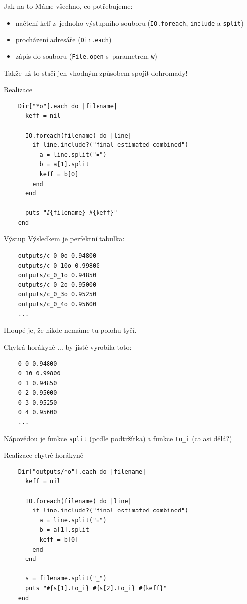 \documentclass{beamer}
\begin{document}
\begin{frame}{Jak na to}
  Máme všechno, co potřebujeme:
  \begin{itemize}
    \item načtení keff z~jednoho výstupního souboru (\texttt{IO.foreach}, \texttt{include} a \texttt{split})
    \item procházení adresáře (\texttt{Dir.each})
    \item zápis do souboru (\texttt{File.open} s~parametrem \texttt{w})
  \end{itemize}
  Takže už to stačí jen vhodným způsobem spojit dohromady!
\end{frame}

\begin{frame}[fragile]{Realizace}
  \scriptsize
  \begin{verbatim}
    Dir["*o"].each do |filename|
      keff = nil

      IO.foreach(filename) do |line|
        if line.include?("final estimated combined")
          a = line.split("=")
          b = a[1].split
          keff = b[0]
        end
      end

      puts "#{filename} #{keff}"
    end
  \end{verbatim}
\end{frame}

\begin{frame}[fragile]{Výstup}
  Výsledkem je perfektní tabulka:
  {\scriptsize
  \begin{verbatim}
    outputs/c_0_0o 0.94800
    outputs/c_0_10o 0.99800
    outputs/c_0_1o 0.94850
    outputs/c_0_2o 0.95000
    outputs/c_0_3o 0.95250
    outputs/c_0_4o 0.95600
    ...
  \end{verbatim}}
  Hloupé je, že nikde nemáme tu polohu tyčí.
\end{frame}


\begin{frame}[fragile]{Chytrá horákyně}
  ... by jistě vyrobila toto:
  {\scriptsize
  \begin{verbatim}
    0 0 0.94800
    0 10 0.99800
    0 1 0.94850
    0 2 0.95000
    0 3 0.95250
    0 4 0.95600
    ...
  \end{verbatim}
  }
  Nápovědou je funkce \texttt{split} (podle podtržítka) a funkce \texttt{to\_i} (co asi dělá?)
\end{frame}

\begin{frame}[fragile]{Realizace chytré horákyně}
  \scriptsize
  \begin{verbatim}
    Dir["outputs/*o"].each do |filename|
      keff = nil

      IO.foreach(filename) do |line|
        if line.include?("final estimated combined")
          a = line.split("=")
          b = a[1].split
          keff = b[0]
        end
      end

      s = filename.split("_")
      puts "#{s[1].to_i} #{s[2].to_i} #{keff}"
    end
  \end{verbatim}
\end{frame}
\end{document}

